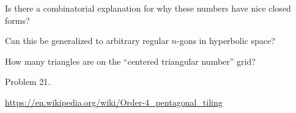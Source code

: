 \documentclass{article}
\begin{document}
\begin{question}
  Is there a combinatorial explanation for why these numbers have nice closed
  forms?
\end{question}

\begin{related}
  \item Can this be generalized to arbitrary regular $n$-gons in hyperbolic
    space?
  \item How many triangles are on the ``centered triangular number'' grid?

\end{related}
\begin{references}
  \item Problem 21.
  \item \url{https://en.wikipedia.org/wiki/Order-4_pentagonal_tiling}
\end{references}
\end{document}
